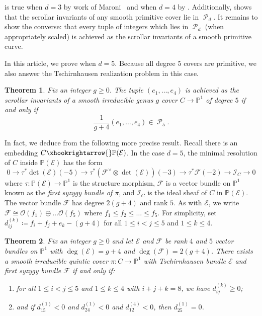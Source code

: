 \documentclass[11pt]{amsart}
\newtheorem{theorem}{Theorem}
\numberwithin{theorem}{section}
\numberwithin{equation}{section}
\theoremstyle{definition}\newtheorem{defn}[theorem]{Definition}
\theoremstyle{definition}\newtheorem{remark}[theorem]{Remark}
\theoremstyle{definition}\newtheorem{question}[theorem]{Question}
\theoremstyle{definition}\newtheorem{problem}[theorem]{Problem}
\newcommand{\PP}{\mathbb{P}}
\newcommand{\cE}{\mathcal{E}}
\newcommand{\cF}{\mathcal{F}}
\newcommand{\cO}{\mathcal{O}}
\DeclareMathOperator{\polytope}{\mathcal{P}}
\begin{document}
 is true when $d = 3$ by work of Maroni~\cite[Section~3]{maroni} and when $d = 4$ by \cite[Theorem~3.1]{VV}. Additionally, \cite[Theorem~1.4]{VV} shows that the scrollar invariants of any smooth primitive cover lie in $\polytope_d$. It remains to show the converse: that every tuple of integers which lies in $\polytope_d$ (when appropriately scaled) is achieved as the scrollar invariants of a smooth primitive curve. 

In this article, we prove  when $d = 5$. Because all degree $5$ covers are primitive, we also answer the Tschirnhausen realization problem in this case. 

\begin{theorem}
\label{thm:main-thm}
Fix an integer $g \geq 0$. The tuple $(e_1,\dots,e_{4})$ is achieved as the scrollar invariants of a smooth irreducible genus $g$ cover $C \to \PP^1$ of degree $5$ if and only if
\[
    \frac{1}{g + 4}(e_1,\dots,e_{4}) \in \polytope_5.
\]
\end{theorem}

In fact, we deduce  from the following more precise result. Recall there is an embedding $C \xhookrightarrow{} \PP(\cE)$. In the case $d = 5$, the minimal resolution of $C$ inside $\PP(\cE)$ has the form
\[
    0 \rightarrow \tau^*\det(\cE)(-5)  \rightarrow \tau^*(\cF^{\vee}\otimes \det(\cE))(-3) \rightarrow \tau^*\cF(-2) \rightarrow \mathcal{I}_C \rightarrow 0
\]
where $\tau \colon \PP(\cE) \to \PP^1$ is the structure morphism, $\cF$ is a vector bundle on $\PP^1$ known as the \emph{first syzygy bundle of $\pi$}, and $\mathcal{I}_C$ is the ideal sheaf of $C$ in $\PP(\cE)$. The vector bundle $\cF$ has degree $2(g+4)$ and rank $5$. As with $\cE$, we write $\cF \cong \cO(f_1) \oplus \dots \cO(f_5)$ where $f_1 \leq f_2 \leq \dots \leq f_5$. For simplicity, set $d^{(k)}_{ij} \coloneqq f_i + f_j + e_k - (g+4)$ for all $1 \leq i < j \leq 5$ and $1 \leq k \leq 4$.

\begin{theorem}
\label{thm:deg-5} 
Fix an integer $g \geq 0$ and let $\cE$ and $\cF$ be rank $4$ and $5$ vector bundles on $\PP^1$ with $\deg(\cE) = g+4$ and $\deg(\cF) = 2(g+4)$. There exists a smooth irreducible quintic cover $\pi \colon C \rightarrow \PP^1$ with Tschirnhausen bundle $\cE$ and first syzygy bundle $\cF$ if and only if:
\begin{enumerate}[label=(\roman*)]
    \item \label{cond1} for all $1 \leq i < j \leq 5$ and $1 \leq k \leq 4$ with $i + j + k = 8$, we have $d^{(k)}_{ij} \geq 0$;
    \item \label{cond2} and if $d^{(1)}_{15} < 0$ and $d^{(1)}_{24} < 0$ and $d^{(4)}_{12} < 0$, then $d^{(1)}_{25} = 0$.
\end{enumerate} 
\end{theorem}
\end{document}
